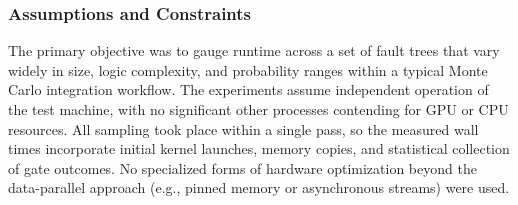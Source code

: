 \subsubsection{Assumptions and Constraints}
The primary objective was to gauge runtime across a set of fault trees that vary widely in size, logic complexity, and probability ranges within a typical Monte Carlo integration workflow. The experiments assume independent operation of the test machine, with no significant other processes contending for GPU or CPU resources. All sampling took place within a single pass, so the measured wall times incorporate initial kernel launches, memory copies, and statistical collection of gate outcomes. No specialized forms of hardware optimization beyond the data-parallel approach (e.g., pinned memory or asynchronous streams) were used.

